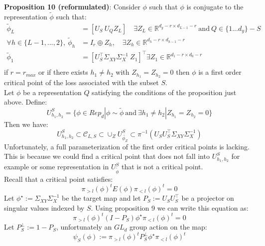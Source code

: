 \documentclass{article}
\theoremstyle{definition}
\begin{document}
\textbf{Proposition 10 (reformulated)}: Consider $\phi$ such that $\phi$ is conjugate to the representation $\tilde{\phi}$ such that:
\begin{align*}
\tilde{\phi}_L & = [U_S \ U_QZ_L ] \quad \exists Z_L\in\mathbb{R}^{d_y-r \times d_{L-1} - r} \ \text{and} \ Q\in\{1...d_y\} - S\\
    \forall h\in\{L-1,...,2\}, \ \tilde{\phi}_h & = I_r \oplus Z_h,  \quad \exists Z_h\in\mathbb{R}^{d_h-r \times d_{h-1} - r}\\
    \tilde{\phi}_1 & = [U_S^{\top}\Sigma_{XY}\Sigma_{X}^{-1} \ Z_1]^{\top} \exists Z_1\in\mathbb{R}^{d_1-r \times d_{0} - r}\\
\end{align*}
if $r=r_{max}$ or if there exists $h_1\neq h_2$ with $Z_{h_1} = Z_{h_2} = 0$ then $\phi$ is a first order critical point of the loss associated with the subset $S$.
\\
Let $\phi$ be a representation $Q$ satisfying the conditions of the proposition just above. Define:
\begin{equation*}
    U^S_{h_1,h_2} = \{\phi\in Rep_d|\phi \sim \tilde{\phi} \ \text{and} \ \exists h_1\neq h_2|Z_{h_1} = Z_{h_2} = 0 \}
\end{equation*}
Then we have:
$$U^S_{h_1,h_2} \subset \mathcal{C}_{L,S} \subset \cup_Z U_{\tilde{\phi_Z}}^S \subset \pi^{-1}(U_SU_S^{\top}\Sigma_{XY}\Sigma_{X}^{-1}) $$
Unfortunately, a full parameterization of the first order critical points is lacking. This is because we could find a critical point that does not fall into $U^S_{h_1,h_2}$ for example or some representation in $U_{\tilde{\phi}}^S$ that is not a critical point.
\\
Recall that a critical point satisfies:
\begin{equation*}
    \pi_{>l}(\phi)^{t}E(\phi)\pi_{<l}(\phi)^{t} = 0
\end{equation*}
Let $\phi^{\star} := \Sigma_{XY}\Sigma_{X}^{-1} $ be the target map and let $P_S:=U_SU_S^{\top}$ be a projector on singular values indexed by $S$. Using proposition 9 we can write this equation as:
\begin{equation*}
    \pi_{>l}(\phi)^{t}(I - P_S)\phi^{\star}\pi_{<l}(\phi)^{t} = 0
\end{equation*}
Let $P_S^{\perp}:= 1 - P_S$, unfortunately an $GL_d$ group action on the map:
\begin{equation*}
    \psi_S(\phi):= \pi_{>l}(\phi)^{t}P_S^{\perp}\phi^{\star}\pi_{<l}(\phi)^{t}
\end{equation*}
\end{document}
